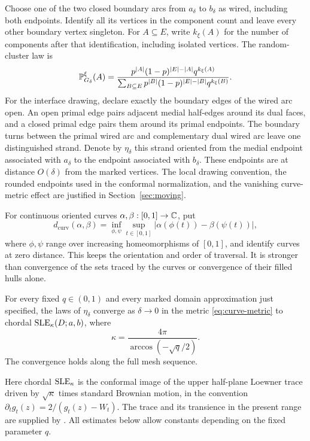 Choose one of the two closed boundary arcs from $a_\delta$ to $b_\delta$
as wired, including both endpoints. Identify all its vertices in the
component count and leave every other boundary vertex singleton.
For $A\subseteq E$, write $k_\xi(A)$ for the
number of components after that identification, including isolated
vertices. The random-cluster law is
\begin{equation}\label{eq:finite-target-law}
 \mathbb P_{G_\delta}^{\xi}(A)
 =\frac{p^{|A|}(1-p)^{|E|-|A|}q^{k_\xi(A)}}
 {\sum_{B\subseteq E}p^{|B|}(1-p)^{|E|-|B|}q^{k_\xi(B)}}.
\end{equation}
For the interface drawing, declare exactly the boundary edges of the
wired arc open.
An open primal edge pairs adjacent medial half-edges around its dual
faces, and a closed primal edge pairs them around its primal endpoints.
The boundary turns between the primal wired arc and complementary dual
wired arc leave one distinguished strand. Denote by $\eta_\delta$ this
strand oriented from the medial endpoint associated with $a_\delta$ to
the endpoint associated with $b_\delta$. These endpoints are at
distance $O(\delta)$ from the marked vertices. The local drawing
convention, the rounded endpoints used in the conformal normalization,
and the vanishing curve-metric effect are justified in
Section~\ref{sec:moving}.

For continuous oriented curves $\alpha,\beta:[0,1]\to\mathbb C$, put
\begin{equation}\label{eq:curve-metric}
 d_{\mathrm{curv}}(\alpha,\beta)
 =\inf_{\phi,\psi}\sup_{t\in[0,1]}
  |\alpha(\phi(t))-\beta(\psi(t))|,
\end{equation}
where $\phi,\psi$ range over increasing homeomorphisms of $[0,1]$,
and identify curves at zero distance. This keeps the orientation and
order of traversal. It is stronger than convergence of the sets traced
by the curves or convergence of their filled hulls alone.

\begin{theorem}\label{thm:main}
For every fixed $q\in(0,1)$ and every marked domain approximation just
specified, the laws of $\eta_\delta$ converge as $\delta\to0$ in
the metric \eqref{eq:curve-metric} to chordal
$\operatorname{SLE}_\kappa(D;a,b)$, where
\[
 \kappa=\frac{4\pi}{\arccos(-\sqrt q/2)}.
\]
The convergence holds along the full mesh sequence.
\end{theorem}

Here chordal $\operatorname{SLE}_\kappa$ is the conformal image of the upper
half-plane Loewner trace driven by $\sqrt\kappa$ times standard
Brownian motion, in the convention
$\partial_tg_t(z)=2/(g_t(z)-W_t)$. The trace and its transience in
the present range are supplied by
\cite[Theorems~5.1 and~7.1]{RohdeSchramm2005}.
All estimates below allow constants depending on the fixed parameter
$q$.

